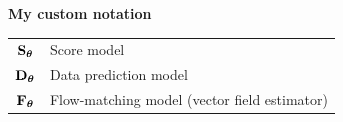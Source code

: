 \vspace{\notationgap}
\begin{minipage}{\textwidth}
\centerline{\bf My custom notation}
\bgroup
\def\arraystretch{1.5}
\begin{tabular}{cp{3.25in}}
$\displaystyle {\mathbf{S}}_{\bm{\theta}}$ & Score model\\
$\displaystyle {\mathbf{D}}_{\bm{\theta}}$ & Data prediction model\\
$\displaystyle {\mathbf{F}}_{\bm{\theta}}$ & Flow-matching model (vector field estimator)\\
\end{tabular}
\egroup
\end{minipage}

\clearpage


